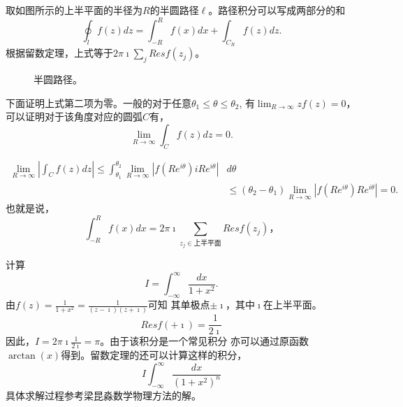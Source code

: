 取如图所示的上半平面的半径为$R$的半圆路径$\ell$。路径积分可以写成两部分的和
\begin{equation}
    \oint_l f(z) d z=\int_{-R}^R f(x) d x+\int_{C_R} f(z) d z .
\end{equation}
根据留数定理，上式等于$2\pi \imath  \sum_j Res f(z_j)$。
%
\begin{figure}[htb!]
    \centering
    
    \caption{半圆路径。}
    \label{fig:semicircle}
\end{figure}
下面证明上式第二项为零。一般的对于任意$\theta_1 \leq \theta \leq \theta_2$, 
有$\lim_{R\to \infty} zf(z) = 0$，可以证明对于该角度对应的圆弧$C$有，
\begin{equation}
    \lim_{R \rightarrow \infty} \int_C f(z) dz = 0 .
\end{equation}

\[
    \begin{aligned}
    \lim _{R \rightarrow \infty}\left|\int_C f(z) d z\right| \leq \int_{\theta_1}^{\theta_2} \lim _{R \rightarrow \infty}\left|f\left(R e^{i \theta}\right) i R e^{i \theta}\right| & d \theta \\
    & \leq\left(\theta_2-\theta_1\right) \lim _{R \rightarrow \infty}\left|f\left(R e^{i \theta}\right) R e^{i \theta}\right|=0 .
    \end{aligned}
\]
也就是说，
\begin{equation}
    \int_{-R}^R f(x) d x = 2\pi \imath  \sum_{z_j\in \textrm{上半平面}} Res f(z_j)，
\end{equation}

\begin{examplebox}{计算\[ 
    I = \int_{-\infty}^{\infty} \frac{dx}{1 + x^2}   .
    \]}
    由$f(z) = \frac{1}{1+ x^2} = \frac{1}{(z-\imath)(z+\imath)}$可知
    其单极点$\pm \imath$，其中$\imath$在上半平面。
    \[
      Res f(+\imath) = \frac{1}{2\imath}  
    \]
    因此，$I = 2\pi \imath  \frac{1}{2\imath} = \pi$。由于该积分是一个常见积分
    亦可以通过原函数$\arctan(x)$得到。留数定理的还可以计算这样的积分，
    \[
      I\int_{-\infty}^{\infty} \frac{dx}{(1 + x^2)^n} 
    \]
    具体求解过程参考梁昆淼数学物理方法的解。
\end{examplebox}


